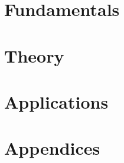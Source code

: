 \documentclass[10pt,%
               b5paper,%
               twoside,openright,%
               titlepage,%
               headinclude,,footinclude,%
               cleardoublepage=empty,%
               captions=tableheading,%
               ]{scrbook}                  %
\begin{document}
    \pagestyle{scrheadings}

     
    
    
    

    \cleardoublepage

    \part{Fundamentals}
    
    \part{Theory}
    
    
    
    
    \part{Applications}
    
    
    
    

    

    \appendix
    \part*{Appendices}
    

    
    
    
\end{document}
